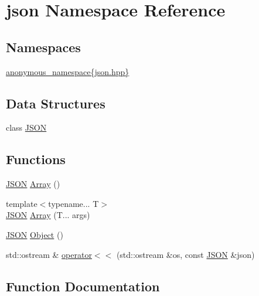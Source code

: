 \hypertarget{namespacejson}{}\section{json Namespace Reference}
\label{namespacejson}
\subsection*{Namespaces}
\begin{DoxyCompactItemize}
\item 
 \mbox{\hyperlink{namespacejson_1_1anonymous__namespace_02json_8hpp_03}{anonymous\+\_\+namespace\{json.\+hpp\}}}
\end{DoxyCompactItemize}
\subsection*{Data Structures}
\begin{DoxyCompactItemize}
\item 
class \mbox{\hyperlink{classjson_1_1_j_s_o_n}{J\+S\+ON}}
\end{DoxyCompactItemize}
\subsection*{Functions}
\begin{DoxyCompactItemize}
\item 
\mbox{\hyperlink{classjson_1_1_j_s_o_n}{J\+S\+ON}} \mbox{\hyperlink{namespacejson_a805054691c80da00fd9129387f834c21}{Array}} ()
\item 
{\footnotesize template$<$typename... T$>$ }\\\mbox{\hyperlink{classjson_1_1_j_s_o_n}{J\+S\+ON}} \mbox{\hyperlink{namespacejson_a8c39b1bf99577bc140f0647d0192219f}{Array}} (T... args)
\item 
\mbox{\hyperlink{classjson_1_1_j_s_o_n}{J\+S\+ON}} \mbox{\hyperlink{namespacejson_a7bc7d25f21c18a652a42db29cfdabd06}{Object}} ()
\item 
std\+::ostream \& \mbox{\hyperlink{namespacejson_a348c2e5bffbeca243a52de2977e71b08}{operator$<$$<$}} (std\+::ostream \&os, const \mbox{\hyperlink{classjson_1_1_j_s_o_n}{J\+S\+ON}} \&json)
\end{DoxyCompactItemize}


\subsection{Function Documentation}
\mbox{\label{namespacejson_a805054691c80da00fd9129387f834c21}} 
